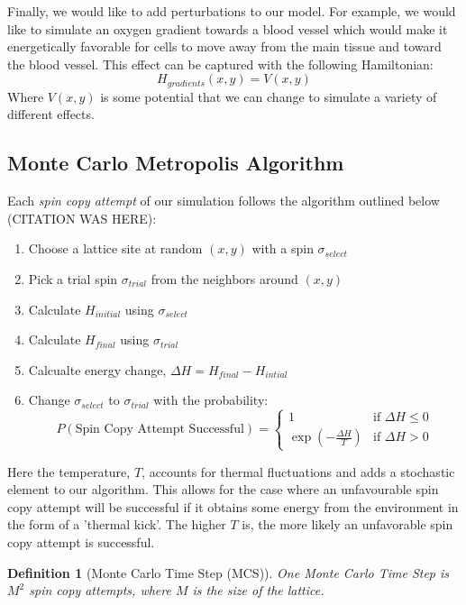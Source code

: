 \documentclass[12pt]{article}
\newtheorem{definition}{Definition}
\begin{document}
Finally, we would like to add perturbations to our model. For example, we would like to simulate an oxygen gradient towards a blood vessel which would make it energetically favorable for cells to move away from the main tissue and toward the blood vessel. This effect can be captured with the following Hamiltonian:
\begin{equation}
	H_{gradients}(x,y) = V(x,y)
\end{equation}
Where $V(x,y)$ is some potential that we can change to simulate a variety of different effects.

\subsection{Monte Carlo Metropolis Algorithm}
Each \emph{spin copy attempt} of our simulation follows the algorithm outlined below (CITATION WAS HERE):

\begin{enumerate}
  \item Choose a lattice site at random $(x,y)$ with a spin $\sigma_{select}$
  \item Pick a trial spin $\sigma_{trial}$ from the neighbors around $(x,y)$
  \item Calculate $H_{initial}$ using $\sigma_{select}$
  \item Calculate $H_{final}$ using $\sigma_{trial}$
  \item Calcualte energy change, $\Delta H = H_{final} - H_{intial}$
  \item{ Change $\sigma_{select}$ to $\sigma_{trial}$ with the probability:
  \begin{equation}
 		P(\text{Spin Copy Attempt Successful}) =
  	\begin{cases}
   		1 & \text{if } \Delta H \leq 0 \\
   		\exp{(-\frac{\Delta H}{T})}       & \text{if } \Delta H > 0
  	\end{cases}
  	\label{p_attempt_success}
	\end{equation}
}
\end{enumerate}

Here the temperature, $T$, accounts for thermal fluctuations and adds a stochastic element to our algorithm. This allows for the case where an unfavourable spin copy attempt will be successful if it obtains some energy from the environment in the form of a 'thermal kick'. The higher $T$ is, the more likely an unfavorable spin copy attempt is successful.

\begin{definition}[Monte Carlo Time Step (MCS)] One Monte Carlo Time Step is $M^2$ spin copy attempts, where $M$ is the size of the lattice.
\end{definition}
\end{document}
